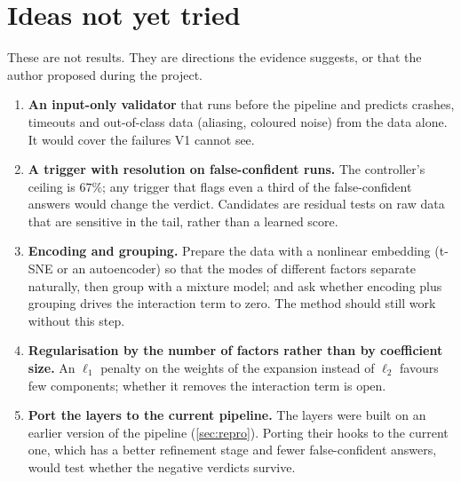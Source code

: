 \documentclass[11pt]{article}
\theoremstyle{plain}
\theoremstyle{definition}
\theoremstyle{remark}
\begin{document}
\section{Ideas not yet tried}\label{sec:ideas}
These are not results. They are directions the evidence suggests, or that the author proposed during the project.
\begin{enumerate}
\item \textbf{An input-only validator} that runs before the pipeline and predicts crashes, timeouts and out-of-class data (aliasing, coloured noise) from the data alone. It would cover the failures V1 cannot see.
\item \textbf{A trigger with resolution on false-confident runs.} The controller's ceiling is $67\%$; any trigger that flags even a third of the false-confident answers would change the verdict. Candidates are
  residual tests on raw data that are sensitive in the tail, rather than a learned score.
\item \textbf{Encoding and grouping.} Prepare the data with a nonlinear embedding (t-SNE or an autoencoder) so that the modes of different factors separate naturally, then group with a mixture model; and ask
  whether encoding plus grouping drives the interaction term to zero. The method should still work without this step.
\item \textbf{Regularisation by the number of factors rather than by coefficient size.} An $\ell_1$ penalty on the weights of the expansion instead of $\ell_2$ favours few components; whether it removes the interaction term is open.
\item \textbf{Port the layers to the current pipeline.} The layers were built on an earlier version of the pipeline (\cref{sec:repro}). Porting their hooks to the current one, which has a better refinement stage and fewer false-confident
  answers, would test whether the negative verdicts survive.
\end{enumerate}
\end{document}
